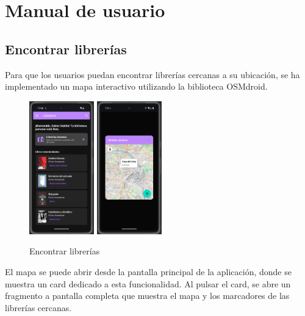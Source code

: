 \documentclass[a4paper,11pt]{report}
\begin{document}
  \chapter{Manual de usuario}
    \section{Encontrar librerías}
      Para que los usuarios puedan encontrar librerías cercanas a su ubicación, se ha implementado un mapa interactivo utilizando la biblioteca OSMdroid.
      \begin{figure}[H]
        \centering
        \includegraphics[width=0.25\textwidth]{.img/mapa_boton.png}
        \hspace{2cm}
        \includegraphics[width=0.25\textwidth]{.img/mapa_fragment.png}
        \caption{Encontrar librerías}
        \label{fig:mapa}
      \end{figure}
      El mapa se puede abrir desde la pantalla principal de la aplicación, donde se muestra un card dedicado a esta funcionalidad.
      Al pulsar el card, se abre un fragmento a pantalla completa que muestra el mapa y los marcadores de las librerías cercanas.
      
\end{document}
